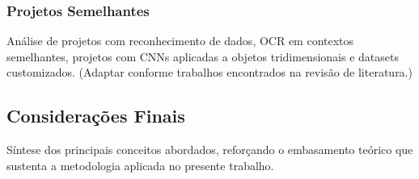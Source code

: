 \subsubsection{Projetos Semelhantes}
Análise de projetos com reconhecimento de dados, OCR em contextos semelhantes, projetos com CNNs aplicadas 
a objetos tridimensionais e datasets customizados.
(Adaptar conforme trabalhos encontrados na revisão de literatura.)

\subsection{Considerações Finais}

Síntese dos principais conceitos abordados, reforçando o embasamento teórico que sustenta a metodologia 
aplicada no presente trabalho.
